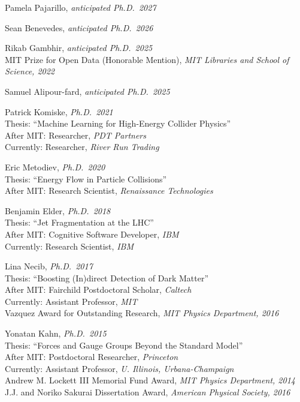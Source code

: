 \bbl

\item Pamela Pajarillo, \emph{anticipated Ph.D.~2027}

\item Sean Benevedes, \emph{anticipated Ph.D.~2026}

\item Rikab Gambhir, \emph{anticipated Ph.D.~2025}
\\ \sh MIT Prize for Open Data (Honorable Mention), \emph{MIT Libraries and School of Science, 2022}

\item Samuel Alipour-fard, \emph{anticipated Ph.D.~2025}

\item Patrick Komiske, \emph{Ph.D.~2021}
\\ \sh Thesis: ``Machine Learning for High-Energy Collider Physics''
\\ \sh After MIT: Researcher, \emph{PDT Partners}
\\ \sh Currently: Researcher, \emph{River Run Trading}

\item Eric Metodiev, \emph{Ph.D.~2020}
\\ \sh Thesis: ``Energy Flow in Particle Collisions''
\\ \sh After MIT: Research Scientist, \emph{Renaissance Technologies}

\item Benjamin Elder, \emph{Ph.D.~2018}
\\ \sh Thesis: ``Jet Fragmentation at the LHC''
\\ \sh After MIT: Cognitive Software Developer, \emph{IBM}
\\ \sh Currently: Research Scientist, \emph{IBM}

\item Lina Necib, \emph{Ph.D.~2017}
\\ \sh Thesis: ``Boosting (In)direct Detection of Dark Matter''
\\ \sh After MIT: Fairchild Postdoctoral Scholar, \emph{Caltech}
\\ \sh Currently: Assistant Professor, \emph{MIT}
\\ \sh Vazquez Award for Outstanding Research, \emph{MIT Physics Department, 2016}

\item Yonatan Kahn, \emph{Ph.D.~2015}
\\ \sh Thesis: ``Forces and Gauge Groups Beyond the Standard Model''
\\ \sh After MIT: Postdoctoral Researcher, \emph{Princeton}
\\ \sh Currently: Assistant Professor, \emph{U. Illinois, Urbana-Champaign}
\\ \sh Andrew M. Lockett III Memorial Fund Award, \emph{MIT Physics Department, 2014}
\\ \sh J.J. and Noriko Sakurai Dissertation Award, \emph{American Physical Society, 2016}

